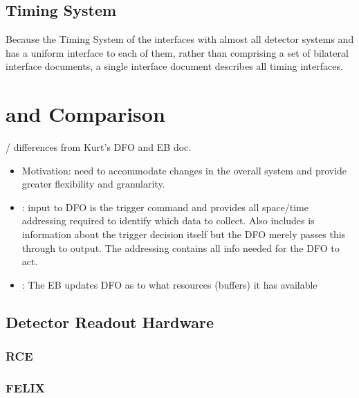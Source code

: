 \subsection{Timing System}
Because the Timing System of the   interfaces with
almost all detector systems and has a uniform interface to each of
them, rather than comprising a set of 
bilateral interface documents, a single interface document
 describes all timing interfaces. 

\section{ and  Comparison}


/ differences from Kurt's DFO and EB doc.
\begin{itemize}
\item Motivation: need to accommodate changes in the overall system and provide greater flexibility and granularity.
\item {}: input to DFO is the trigger command and provides all space/time addressing required to identify which data to collect.  Also includes is information about the trigger decision itself but the DFO merely passes this through to output.  The addressing contains all info needed for the DFO to act.
\item {}: The EB updates DFO as to what resources (buffers) it has available
\end{itemize}

\subsection{Detector Readout Hardware}


\subsubsection{RCE}

\subsubsection{FELIX}

